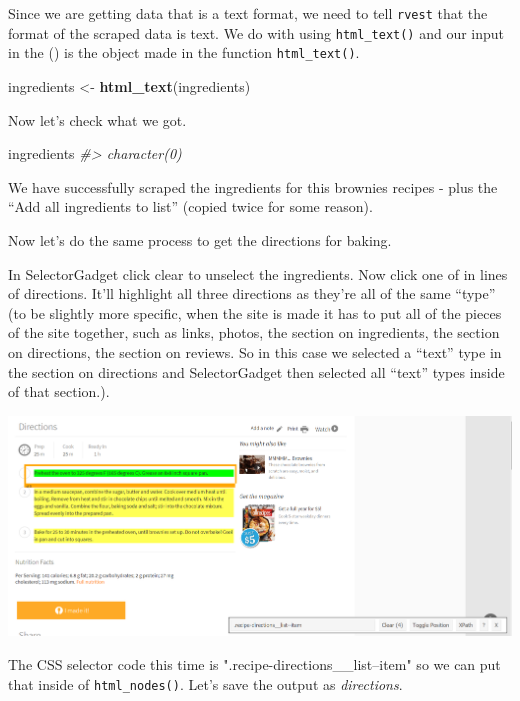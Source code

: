\documentclass[
  12pt,
]{book}
\newenvironment{Shaded}{\begin{snugshade}}{\end{snugshade}}
\newcommand{\CommentTok}[1]{\textcolor[rgb]{0.56,0.35,0.01}{\textit{#1}}}
\newcommand{\KeywordTok}[1]{\textcolor[rgb]{0.13,0.29,0.53}{\textbf{#1}}}
\newcommand{\NormalTok}[1]{#1}
\newcommand{\StringTok}[1]{\textcolor[rgb]{0.31,0.60,0.02}{#1}}
\begin{document}
Since we are getting data that is a text format, we need to tell \texttt{rvest} that the format of the scraped data is text. We do with using \texttt{html\_text()} and our input in the () is the object made in the function \texttt{html\_text()}.

\begin{Shaded}
\begin{Highlighting}[]
\NormalTok{ingredients <{-}}\StringTok{ }\KeywordTok{html\_text}\NormalTok{(ingredients)}
\end{Highlighting}
\end{Shaded}

Now let's check what we got.

\begin{Shaded}
\begin{Highlighting}[]
\NormalTok{ingredients}
\CommentTok{\#> character(0)}
\end{Highlighting}
\end{Shaded}

We have successfully scraped the ingredients for this brownies recipes - plus the ``Add all ingredients to list'' (copied twice for some reason).

Now let's do the same process to get the directions for baking.

In SelectorGadget click clear to unselect the ingredients. Now click one of in lines of directions. It'll highlight all three directions as they're all of the same ``type'' (to be slightly more specific, when the site is made it has to put all of the pieces of the site together, such as links, photos, the section on ingredients, the section on directions, the section on reviews. So in this case we selected a ``text'' type in the section on directions and SelectorGadget then selected all ``text'' types inside of that section.).

\includegraphics{images/brownies_5.PNG}

The CSS selector code this time is ".recipe-directions\_\_list--item" so we can put that inside of \texttt{html\_nodes()}. Let's save the output as \emph{directions}.
\end{document}
